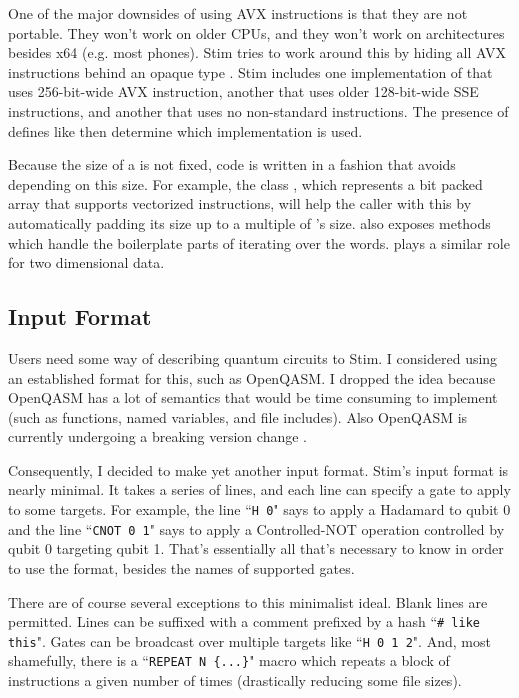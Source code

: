 \documentclass[onecolumn,unpublished]{quantumarticle}
\theoremstyle{definition}
\theoremstyle{definition}
\theoremstyle{definition}
\begin{document}
One of the major downsides of using AVX instructions is that they are not portable.
They won't work on older CPUs, and they won't work on architectures besides x64 (e.g. most phones).
Stim tries to work around this by hiding all AVX instructions behind an opaque type .
Stim includes one implementation of  that uses 256-bit-wide AVX instruction, another that uses older 128-bit-wide SSE instructions, and another that uses no non-standard instructions.
The presence of defines like  then determine which  implementation is used.

Because the size of a  is not fixed, code is written in a fashion that avoids depending on this size.
For example, the class , which represents a bit packed array that supports vectorized instructions, will help the caller with this by automatically padding its size up to a multiple of 's size.
 also exposes methods which handle the boilerplate parts of iterating over the words.
 plays a similar role for two dimensional data.

\subsection{Input Format}

Users need some way of describing quantum circuits to Stim.
I considered using an established format for this, such as OpenQASM.
I dropped the idea because OpenQASM has a lot of semantics that would be time consuming to implement (such as functions, named variables, and file includes).
Also OpenQASM is currently undergoing a breaking version change \cite{openqasmbreakingchange}.

Consequently, I decided to make yet another input format.
Stim's input format is nearly minimal.
It takes a series of lines, and each line can specify a gate to apply to some targets.
For example, the line ``\texttt{H 0}" says to apply a Hadamard to qubit 0 and the line ``\texttt{CNOT 0 1}" says to apply a Controlled-NOT operation controlled by qubit 0 targeting qubit 1.
That's essentially all that's necessary to know in order to use the format, besides the names of supported gates.

There are of course several exceptions to this minimalist ideal.
Blank lines are permitted.
Lines can be suffixed with a comment prefixed by a hash ``\texttt{\# like this}".
Gates can be broadcast over multiple targets like ``\texttt{H 0 1 2}".
And, most shamefully, there is a ``\texttt{REPEAT N \{...\}}" macro which repeats a block of instructions a given number of times (drastically reducing some file sizes).
\end{document}
